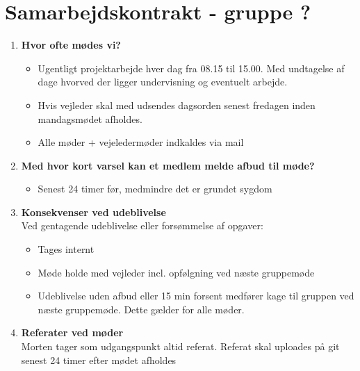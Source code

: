 

	\chapter*{Samarbejdskontrakt - gruppe ?}
	\begin{enumerate}
		\item \textbf{Hvor ofte mødes vi?}
			\begin{itemize}[-]
				\itemsep 0.3em
				\item Ugentligt projektarbejde hver dag fra 08.15 til 15.00. Med undtagelse af dage hvorved der ligger undervisning og eventuelt arbejde.
				\item Hvis vejleder skal med udsendes dagsorden senest fredagen inden mandagsmødet afholdes.
				\item Alle møder + vejeledermøder indkaldes via mail
				\vspace{1cm}				
			\end{itemize}
		\item \textbf{Med hvor kort varsel kan et medlem melde afbud til møde?}
			\begin{itemize}[-]
				\itemsep 0.3em
				\item Senest 24 timer før, medmindre det er grundet sygdom
				\vspace{1cm}
			\end{itemize}
			
		\item \textbf{Konsekvenser ved udeblivelse}\\
			Ved gentagende udeblivelse eller forsømmelse af opgaver:
			\begin{itemize}[-]
				\itemsep 0.3em
				\item Tages internt
				\item Møde holde med vejleder incl. opfølgning ved næste gruppemøde
				\item Udeblivelse uden afbud eller 15 min forsent medfører kage til gruppen ved næste gruppemøde. Dette gælder for alle møder.
				\vspace{1cm}
			\end{itemize}
		\item \textbf{Referater ved møder} \\
				Morten tager som udgangspunkt altid referat.
				Referat skal uploades på git senest 24 timer efter mødet afholdes
				\vspace{1cm}
			

\end{enumerate}
